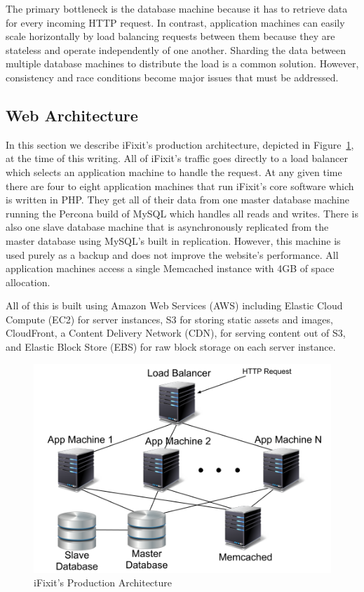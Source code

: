 \documentclass[12pt]{ucthesis}
\begin{document}
The primary bottleneck is the database machine because it has to retrieve data for every incoming HTTP request.
In contrast, application machines can easily scale horizontally by load balancing requests between them because they are stateless and operate independently of one another.
Sharding the data between multiple database machines to distribute the load is a common solution.
However, consistency and race conditions become major issues that must be addressed.

\subsection{Web Architecture}
In this section we describe \textsf{iFixit}'s production architecture, depicted in Figure~\ref{fig:iFixitArchitecture}, at the time of this writing.
All of \textsf{iFixit}'s traffic goes directly to a load balancer which selects an application machine to handle the request.
At any given time there are four to eight application machines that run \textsf{iFixit}'s core software which is written in PHP\@.
They get all of their data from one master database machine running the Percona build of \textsf{MySQL} which handles all reads and writes.
There is also one slave database machine that is asynchronously replicated from the master database using \textsf{MySQL}'s built in replication.
However, this machine is used purely as a backup and does not improve the website's performance.
All application machines access a single \textsf{Memcached} instance with 4GB of space allocation.

All of this is built using Amazon Web Services (AWS) including Elastic Cloud Compute (EC2) for server instances, S3 for storing static assets and images, CloudFront, a Content Delivery Network (CDN), for serving content out of S3, and Elastic Block Store (EBS) for raw block storage on each server instance.

\begin{figure}[h]
\centering
\includegraphics[width=\textwidth]{assets/iFixitArchitecture.png}
\caption{iFixit's Production Architecture}
\label{fig:iFixitArchitecture}
\end{figure}
\end{document}
